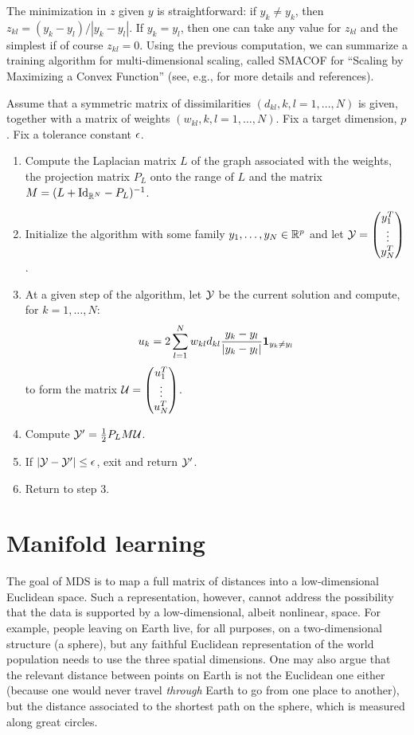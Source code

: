 The minimization in $z$ given $y$ is straightforward: if $y_k\neq y_k$, then $z_{kl} = (y_k-y_l)/|y_k-y_l|$. If $y_k=y_l$, then one can take any value for $z_{kl}$ and the simplest if of course $z_{kl}=0$. Using the previous computation, we can summarize a training algorithm for multi-dimensional scaling, called SMACOF for ``Scaling by Maximizing a Convex Function'' (see, e.g., \citet{borg2005modern} for more details and references).

\begin{algorithm}[SMACOF]
Assume that a symmetric matrix of dissimilarities $(d_{kl}, k,l=1, \ldots, N)$ is given, together with a matrix of weights $(w_{kl}, k,l=1, \ldots, N)$. Fix a target dimension, $p$. Fix a tolerance constant $\epsilon$.
\begin{enumerate}[label=\arabic*., wide=0.5cm]
\item Compute the Laplacian matrix $L$ of the graph associated with the weights, the projection matrix $P_L$ onto the range of $L$ and the matrix $M = (L + \Id[N] - P_L)^{-1}$.
\item Initialize the algorithm with some family $y_1, \ldots, y_N \in {\mathbb{R}}^p$ and let ${\mathcal Y} = \begin{pmatrix} y_1^T\\ \vdots \\ y_N^T\end{pmatrix}$.
\item At a given step of the algorithm, let ${\mathcal Y}$ be the current solution and compute, for $k=1, \ldots, N$:
\[
u_{k} = 2 \sum_{l=1}^N w_{kl} d_{kl} \frac{y_{k}-y_{l}}{|y_k-y_l|} {\bm 1}_{y_k\neq y_l}
\]
to form the matrix ${\mathcal U} = \begin{pmatrix} u_1^T\\ \vdots \\ u_N^T\end{pmatrix}$.
\item Compute ${\mathcal Y}' = \frac12  P_L M {\mathcal U}$.
\item If $|{\mathcal Y} -{\mathcal Y}'| \leq \epsilon$, exit and return ${\mathcal Y}'$.
\item Return to step 3.
\end{enumerate}
\end{algorithm}


\section{Manifold learning}

The goal of MDS is to map a full matrix of distances into a low-dimensional Euclidean space. Such a representation, however, cannot address the possibility that the data is supported by a low-dimensional, albeit nonlinear, space.  For example, people leaving on Earth live, for all purposes, on a two-dimensional structure (a sphere), but any faithful Euclidean representation of the world population needs to use the three spatial dimensions. One may also argue that the relevant distance between points on Earth is not the Euclidean one either (because one would never travel {\em through}  Earth to go from one place to another), but the distance associated to the shortest path on the sphere, which is measured along great circles.

